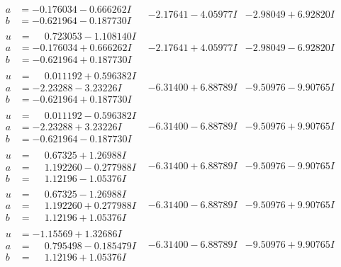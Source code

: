 \documentclass[1p]{elsarticle_modified}
\theoremstyle{definition}
\begin{document}
$$\begin{array}{c|c|c}
\begin{aligned}
a &= -0.176034 - 0.666262 I \\
b &= -0.621964 - 0.187730 I\end{aligned}
 & -2.17641 - 4.05977 I & -2.98049 + 6.92820 I \\ \hline\begin{aligned}
u &= \phantom{-}0.723053 - 1.108140 I \\
a &= -0.176034 + 0.666262 I \\
b &= -0.621964 + 0.187730 I\end{aligned}
 & -2.17641 + 4.05977 I & -2.98049 - 6.92820 I \\ \hline\begin{aligned}
u &= \phantom{-}0.011192 + 0.596382 I \\
a &= -2.23288 - 3.23226 I \\
b &= -0.621964 + 0.187730 I\end{aligned}
 & -6.31400 + 6.88789 I & -9.50976 - 9.90765 I \\ \hline\begin{aligned}
u &= \phantom{-}0.011192 - 0.596382 I \\
a &= -2.23288 + 3.23226 I \\
b &= -0.621964 - 0.187730 I\end{aligned}
 & -6.31400 - 6.88789 I & -9.50976 + 9.90765 I \\ \hline\begin{aligned}
u &= \phantom{-}0.67325 + 1.26988 I \\
a &= \phantom{-}1.192260 - 0.277988 I \\
b &= \phantom{-}1.12196 - 1.05376 I\end{aligned}
 & -6.31400 + 6.88789 I & -9.50976 - 9.90765 I \\ \hline\begin{aligned}
u &= \phantom{-}0.67325 - 1.26988 I \\
a &= \phantom{-}1.192260 + 0.277988 I \\
b &= \phantom{-}1.12196 + 1.05376 I\end{aligned}
 & -6.31400 - 6.88789 I & -9.50976 + 9.90765 I \\ \hline\begin{aligned}
u &= -1.15569 + 1.32686 I \\
a &= \phantom{-}0.795498 - 0.185479 I \\
b &= \phantom{-}1.12196 + 1.05376 I\end{aligned}
 & -6.31400 - 6.88789 I & -9.50976 + 9.90765 I \\ \hline\begin{aligned}

\end{aligned}
\end{array}$$
\end{document}
